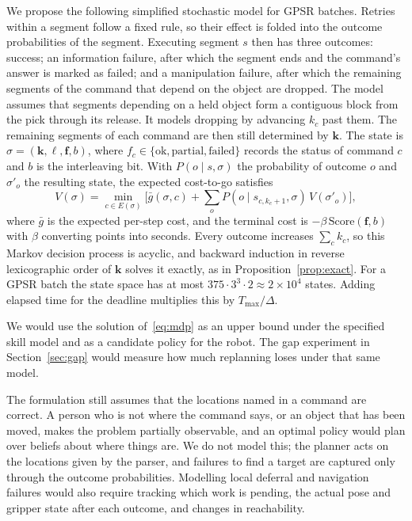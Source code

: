 \documentclass[conference]{IEEEtran}
\newcommand{\todo}[1]{}
\newcommand{\todo}[1]{\textcolor{red}{[TODO: #1]}}
\begin{document}
We propose the following simplified stochastic model for GPSR batches.
Retries within a segment follow a fixed rule, so their effect is folded into the outcome
probabilities of the segment. Executing segment $s$ then has three outcomes:
success; an information failure, after which the segment ends and the command's
answer is marked as failed; and a manipulation failure, after which the
remaining segments of the command that depend on the object are dropped. The
model assumes that segments depending on a held object form a contiguous
block from the pick through its release. It models dropping by advancing
$k_c$ past them. The remaining segments of each command are then still
determined by $\mathbf{k}$. The state is $\sigma=(\mathbf{k},\ell,\mathbf{f},b)$, where
$f_c\in\{\text{ok},\text{partial},\text{failed}\}$ records the status of
command $c$ and $b$ is the interleaving bit. With $P(o\mid s,\sigma)$ the
probability of outcome $o$ and $\sigma'_o$ the resulting state, the expected
cost-to-go satisfies
\begin{equation}\label{eq:mdp}
V(\sigma)=\min_{c\in E(\sigma)}\Big[\bar g(\sigma,c)
+\sum_{o}P(o\mid s_{c,k_c+1},\sigma)\,V(\sigma'_o)\Big],
\end{equation}
where $\bar g$ is the expected per-step cost, and the terminal cost is
$-\beta\,\mathrm{Score}(\mathbf{f},b)$ with $\beta$ converting points into
seconds. Every outcome increases $\sum_c k_c$, so this Markov decision process
is acyclic, and backward induction in reverse lexicographic order of
$\mathbf{k}$ solves it exactly, as in Proposition~\ref{prop:exact}. For a GPSR
batch the state space has at most $375\cdot3^3\cdot2\approx2\times10^4$ states.
Adding elapsed time for the deadline multiplies this by $T_{\max}/\Delta$.

We would use the solution of~\eqref{eq:mdp} as an upper bound under the
specified skill model and as a candidate policy for the robot. The gap
experiment in Section~\ref{sec:gap} would measure how much replanning loses
under that same model. \todo{Implement and compare the policies.}

The formulation still assumes that the locations named in a command are
correct. A person who is not where the command says, or an object that has
been moved, makes the problem partially observable, and an optimal policy
would plan over beliefs about where things are. We do not model this; the
planner acts on the locations given by the parser, and failures to find a
target are captured only through the outcome probabilities.
Modelling local deferral and navigation failures would also require
tracking which work is pending, the actual pose and gripper state after
each outcome, and changes in reachability.
\end{document}
